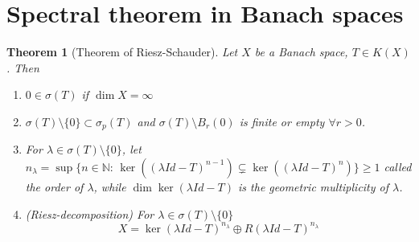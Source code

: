 \documentclass[a4paper, 12pt]{article}
\theoremstyle{plain}
\newtheorem{theorem}{Theorem}[subsection] %
\theoremstyle{definition}
\theoremstyle{lemma}
\theoremstyle{remark}
\theoremstyle{corollary}
\theoremstyle{example}
\begin{document}
\section{Spectral theorem in Banach spaces}
	\begin{theorem}[Theorem of Riesz-Schauder]
		Let $X$ be a Banach space, $T \in K(X)$. Then \begin{enumerate}
			\item $0 \in \sigma(T)$ if $\dim X = \infty$
			\item $\sigma(T) \setminus \{0\} \subset \sigma_p(T)$ and $\sigma(T) \setminus B_r(0)$ is finite or empty $\forall r > 0$.
			\item For $\lambda \in \sigma(T) \setminus \{0\}$, let $n_\lambda = \sup \{n \in \mathbb{N}: \, \ker((\lambda Id - T)^{n-1}) \subsetneq \ker((\lambda Id - T)^n)\} \geq 1$ called the order of $\lambda$, while $\dim \ker (\lambda Id - T)$ is the geometric multiplicity of $\lambda$.
			\item (Riesz-decomposition) For $\lambda \in \sigma(T) \setminus \{0\}$ \[X = \ker(\lambda Id - T)^{n_\lambda} \oplus R(\lambda Id -T)^{n_\lambda}\]
		\end{enumerate}
	\end{theorem}
\end{document}
